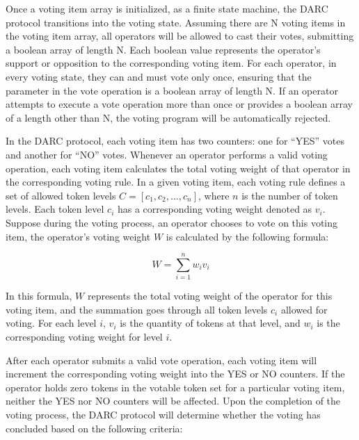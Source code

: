 \documentclass[main.tex]{subfiles}
\begin{document}
Once a voting item array is initialized, as a finite state machine, the DARC protocol transitions into the voting state. Assuming there are N voting items in the voting item array, all operators will be allowed to cast their votes, submitting a boolean array of length N. Each boolean value represents the operator's support or opposition to the corresponding voting item. For each operator, in every voting state, they can and must vote only once, ensuring that the parameter in the vote operation is a boolean array of length N. If an operator attempts to execute a vote operation more than once or provides a boolean array of a length other than N, the voting program will be automatically rejected.

In the DARC protocol, each voting item has two counters: one for ``YES'' votes and another for ``NO'' votes. Whenever an operator performs a valid voting operation, each voting item calculates the total voting weight of that operator in the corresponding voting rule. In a given voting item, each voting rule defines a set of allowed token levels \(C = [c_1, c_2, ..., c_n]\), where \(n\) is the number of token levels. Each token level \(c_i\) has a corresponding voting weight denoted as \(v_i\). Suppose during the voting process, an operator chooses to vote on this voting item, the operator's voting weight \(W\) is calculated by the following formula:

\[
W = \sum_{i=1}^{n} w_i v_i
\]

In this formula, \(W\) represents the total voting weight of the operator for this voting item, and the summation goes through all token levels \(c_i\) allowed for voting. For each level \(i\), \(v_i\) is the quantity of tokens at that level, and \(w_i\) is the corresponding voting weight for level \(i\).

After each operator submits a valid vote operation, each voting item will increment the corresponding voting weight into the YES or NO counters. If the operator holds zero tokens in the votable token set for a particular voting item, neither the YES nor NO counters will be affected. Upon the completion of the voting process, the DARC protocol will determine whether the voting has concluded based on the following criteria:
\end{document}
